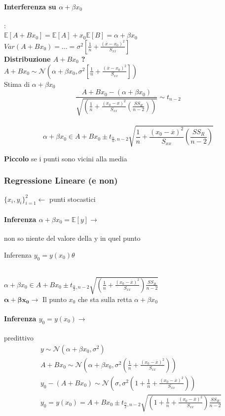 \documentclass[]{article}
\newcommand{\ev}{\mathbb{E}[X]}
\renewcommand{\ev}[1]{\mathbb{E}\left[#1\right]}
\begin{document}
    \paragraph{Interferenza su $\alpha + \beta x_0$}: \\[2ex]
    $\ev{A+Bx_0} = \ev{A} + x_0 \ev{B} = \alpha + \beta x_0$ \\
    $Var(A+B x_0) = \ldots = \sigma^2[\frac{1}{n} + \frac{(\overline{x} - x_0)^2}{S_{xx}}]$ \\[3ex]
    \textbf{Distribuzione $A+B x_0$ ?} \\
    $A+B x_0 \sim \mathcal{N}(\alpha + \beta x_0, \sigma^2 [\frac{1}{n} + \frac{(\overline{x} - x_0)^2}{S_{xx}}])$ \\
    Stima di $\alpha + \beta x_0$ \\
    \[ \frac{A + B x_0 - (\alpha + \beta x_0)}{\sqrt{(\frac{1}{n} + \frac{(x_0 - x)^2}{S_{xx}}(\frac{SS_R}{n-2}))}} \sim t_{n-2} \] \\[2ex]
    \[ \alpha + \beta x_0 \in A + B x_0 \pm t_{\frac{\alpha}{n}, n-2} \sqrt{\frac{1}{n} + \frac{(x_0 - \overline{x})^2}{S_{xx}} (\frac{SS_R}{n-2})} \]
    \centerline{\textbf{Piccolo} se i punti sono vicini alla media}
    \subsubsection{Regressione Lineare (e non)}
    $\displaystyle \{ x_i, y_i \}^2_{i=1} \leftarrow$ punti stocastici \\
    \paragraph{Inferenza $\alpha + \beta x_0 = \ev{y} \rightarrow$} non so niente del valore della y in quel punto
    \centerline{Inferenza $y_0 = y(x_0) \theta$} \\[2ex]
    $\displaystyle\alpha + \beta x_0 \in A + B x_0 \pm t_{\frac{\alpha}{2}, n-2} \sqrt{(\frac{1}{n} + \frac{(x_0 - \overline{x})^2}{S_{xx}})\frac{SS_R}{n-2}}$ \\
    $\mathbf{\alpha + \beta x_0} \rightarrow$ Il punto $x_0$ che sta sulla retta $\alpha + \beta x_0$
    \paragraph{Inferenza $y_0 = y(x_0) \rightarrow$} predittivo
    \begin{equation*}
        \begin{aligned}
            & y \sim \mathcal{N}(\alpha + \beta x_0, \sigma^2) \\
            & A + B x_0 \sim \mathcal{N}(\alpha + \beta x_0, \sigma^2 (\frac{1}{n} + \frac{(x_0 - \overline{x})^2}{S_{xx}})) \\
            & y_0 - (A + B x_0) \sim \mathcal{N}(\sigma, \sigma^2 (1 + \frac{1}{n} + \frac{(x_0 - \overline{x})^2}{S_{xx}})) \\
            & y_0 = y(x_0) = A + B x_0 \pm t_{\frac{\alpha}{2}, n-2} \sqrt{(1 + \frac{1}{n} + \frac{(x_0 - \overline{x})^2}{S_{xx}}) \frac{SS_R}{n-2}}
        \end{aligned}
    \end{equation*}
\end{document}
